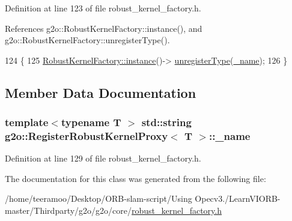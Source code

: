 Definition at line 123 of file robust\+\_\+kernel\+\_\+factory.\+h.



References g2o\+::\+Robust\+Kernel\+Factory\+::instance(), and g2o\+::\+Robust\+Kernel\+Factory\+::unregister\+Type().


\begin{DoxyCode}
124       \{
125         \hyperlink{classg2o_1_1RobustKernelFactory_a9cc4361620f8d7269ad9774d3aba2fc0}{RobustKernelFactory::instance}()->
      \hyperlink{classg2o_1_1RobustKernelFactory_af3b0dac653627b5f87c68d4180b87475}{unregisterType}(\hyperlink{classg2o_1_1RegisterRobustKernelProxy_af88f8066f09024c0a94c90d1b99bf1c4}{\_name});
126       \}
\end{DoxyCode}


\subsection{Member Data Documentation}
\subsubsection[{\texorpdfstring{\+\_\+name}{_name}}]{\setlength{\rightskip}{0pt plus 5cm}template$<$typename T $>$ std\+::string {\bf g2o\+::\+Register\+Robust\+Kernel\+Proxy}$<$ T $>$\+::\+\_\+name\hspace{0.3cm}{\ttfamily [private]}}\hypertarget{classg2o_1_1RegisterRobustKernelProxy_af88f8066f09024c0a94c90d1b99bf1c4}{}\label{classg2o_1_1RegisterRobustKernelProxy_af88f8066f09024c0a94c90d1b99bf1c4}


Definition at line 129 of file robust\+\_\+kernel\+\_\+factory.\+h.



The documentation for this class was generated from the following file\+:\begin{DoxyCompactItemize}
\item 
/home/teeramoo/\+Desktop/\+O\+R\+B-\/slam-\/script/\+Using Opecv3./\+Learn\+V\+I\+O\+R\+B-\/master/\+Thirdparty/g2o/g2o/core/\hyperlink{robust__kernel__factory_8h}{robust\+\_\+kernel\+\_\+factory.\+h}\end{DoxyCompactItemize}
